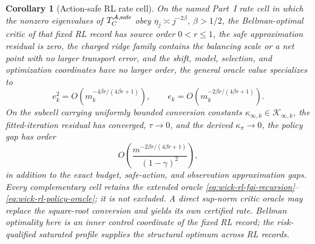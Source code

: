 \documentclass[11pt]{article}
\numberwithin{section}{part}
\theoremstyle{plain}
\newtheorem{corollary}[corollary]{Corollary}
\theoremstyle{definition}
\theoremstyle{remark}
\begin{document}
\begin{corollary}[Action-safe RL rate cell]
\label{cor:wick-rl-learning-rate}
On the named Part~I rate cell in which the nonzero eigenvalues of
\(T_C^{\mathcal A,{\rm safe}}\) obey
\(\eta_j\asymp j^{-2\beta}\), \(\beta>1/2\), the Bellman-optimal critic of
that fixed RL record has source order \(0<r\le1\), the safe approximation residual is
zero, the charged ridge family contains the balancing scale or a net point
with no larger transport error, and the shift, model, selection, and
optimization coordinates have no larger order, the general oracle value
specializes to
\begin{equation}
 \label{eq:wick-rl-rate}
 e_k^2=O\!\left(m_k^{-4\beta r/(4\beta r+1)}\right),
 \qquad
 e_k=O\!\left(m_k^{-2\beta r/(4\beta r+1)}\right).
\end{equation}
On the subcell carrying uniformly bounded conversion constants
\(\kappa_{\infty,k}\in\mathcal K_{\infty,k}\),
the fitted-iteration residual has converged, \(\tau\to0\), and the derived
\(\kappa_\pi\to0\), the policy gap has order
\begin{equation}
 \label{eq:wick-rl-policy-rate}
 O\!\left(
 \frac{m^{-2\beta r/(4\beta r+1)}}{(1-\gamma)^2}
 \right),
\end{equation}
in addition to the exact budget, safe-action, and observation approximation
gaps.  Every complementary cell retains the extended oracle
\eqref{eq:wick-rl-fqi-recursion}--\eqref{eq:wick-rl-policy-oracle}; it is not
excluded.  A direct sup-norm critic oracle may replace the square-root
conversion and yields its own certified rate.  Bellman optimality here is an
inner control coordinate of the fixed RL record; the risk-qualified saturated
profile supplies the structural optimum across RL records.
\end{corollary}
\end{document}
